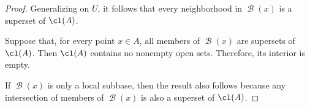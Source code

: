 \begin{proof}
  Generalizing on \( U \), it follows that every neighborhood in \( \mscrB(x) \) is a superset of \( \cl(A) \).

  \NecessitySubProof* Suppose that, for every point \( x \in A \), all members of \( \mscrB(x) \) are supersets of \( \cl(A) \). Then \( \cl(A) \) contains no nonempty open sets. Therefore, its interior is empty.

  If \( \mscrB(x) \) is only a local subbase, then the result also follows because any intersection of members of \( \mscrB(x) \) is also a superset of \( \cl(A) \).
\end{proof}
